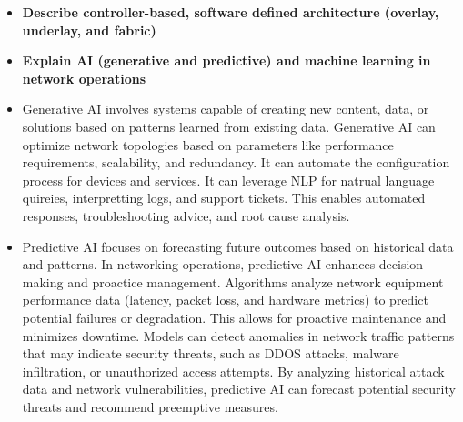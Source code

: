 \documentclass{article}
\begin{document}
\begin{itemize}
  \item \textbf{Describe controller-based, software defined architecture (overlay, underlay, and fabric)} 
  
  \item \textbf{Explain AI (generative and predictive) and machine learning in network operations}
  	\item[] Generative AI involves systems capable of creating new content, data, or solutions based on patterns learned from existing data. Generative AI can optimize network topologies based on parameters like performance requirements, scalability, and redundancy. It can automate the configuration process for devices and services. It can leverage NLP for natrual language quireies, interpretting logs, and support tickets. This enables automated responses, troubleshooting advice, and root cause analysis.
	\item[] Predictive AI focuses on forecasting future outcomes based on historical data and patterns. In networking operations, predictive AI enhances decision-making and proactice management. Algorithms analyze network equipment performance data (latency, packet loss, and hardware metrics) to predict potential failures or degradation. This allows for proactive maintenance and minimizes downtime. Models can detect anomalies in network traffic patterns that may indicate security threats, such as DDOS attacks, malware infiltration, or unauthorized access attempts. By analyzing historical attack data and network vulnerabilities, predictive AI can forecast potential security threats and recommend preemptive measures.


\end{itemize}
\end{document}
